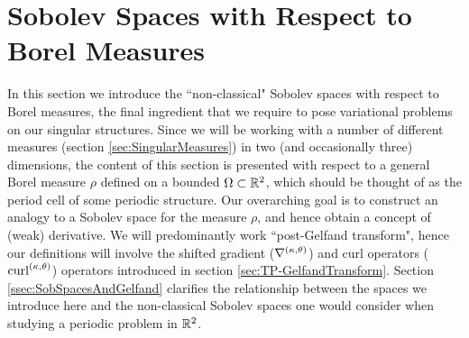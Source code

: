 \section{Sobolev Spaces with Respect to Borel Measures} \label{sec:BorelMeasSobSpaces}
In this section we introduce the ``non-classical" Sobolev spaces with respect to Borel measures, the final ingredient that we require to pose variational problems on our singular structures.
Since we will be working with a number of different measures (section \ref{sec:SingularMeasures}) in two  (and occasionally three) dimensions, the content of this section is presented with respect to a general Borel measure $\rho$ defined on a bounded $\Omega\subset\mathbb{R}^2$, which should be thought of as the period cell of some periodic structure.
Our overarching goal is to construct an analogy to a Sobolev space for the measure $\rho$, and hence obtain a concept of (weak) derivative.
We will predominantly work ``post-Gelfand transform", hence our definitions will involve the shifted gradient ($\nabla^{\left( \kappa, \theta \right)}$) and curl operators ($\mathrm{curl}_{}^{\left( \kappa, \theta \right)}$) operators introduced in section \ref{sec:TP-GelfandTransform}.
Section \ref{ssec:SobSpacesAndGelfand} clarifies the relationship between the spaces we introduce here and the non-classical Sobolev spaces one would consider when studying a periodic problem in $\mathbb{R}^2$.

